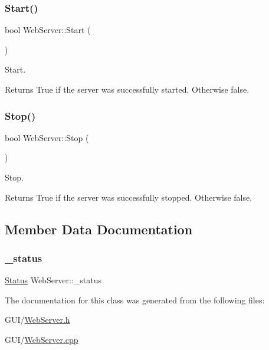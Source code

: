 \subsubsection{\texorpdfstring{Start()}{Start()}}
{\footnotesize\ttfamily bool Web\+Server\+::\+Start (\begin{DoxyParamCaption}{ }\end{DoxyParamCaption})}



Start. 

\begin{DoxyReturn}{Returns}
True if the server was successfully started. Otherwise false. 
\end{DoxyReturn}
\mbox{\label{classWebServer_af27f38bac6c5f718ae25deeb3369fb8a}} 
\subsubsection{\texorpdfstring{Stop()}{Stop()}}
{\footnotesize\ttfamily bool Web\+Server\+::\+Stop (\begin{DoxyParamCaption}{ }\end{DoxyParamCaption})}



Stop. 

\begin{DoxyReturn}{Returns}
True if the server was successfully stopped. Otherwise false. 
\end{DoxyReturn}


\subsection{Member Data Documentation}
\mbox{\label{classWebServer_acde07bc97f932a6690ab659625309562}} 
\subsubsection{\texorpdfstring{\+\_\+status}{\_status}}
{\footnotesize\ttfamily \hyperlink{classWebServer_a350f14f5d1522610502fb95f346e4a3c}{Status} Web\+Server\+::\+\_\+status\hspace{0.3cm}{\ttfamily [private]}}



The documentation for this class was generated from the following files\+:\begin{DoxyCompactItemize}
\item 
G\+U\+I/\hyperlink{WebServer_8h}{Web\+Server.\+h}\item 
G\+U\+I/\hyperlink{WebServer_8cpp}{Web\+Server.\+cpp}\end{DoxyCompactItemize}
